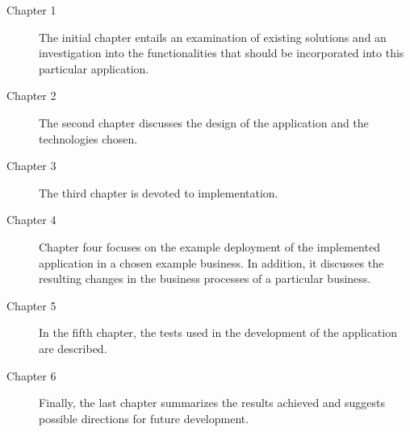 \begin{description}
\item[Chapter 1] The initial chapter entails an examination of existing solutions and an investigation into the functionalities that should be incorporated into this particular application.

\item[Chapter 2] The second chapter discusses the design of the application and the technologies chosen.

\item[Chapter 3] The third chapter is devoted to implementation.

\item[Chapter 4] Chapter four focuses on the example deployment of the implemented application in a chosen example business. In addition, it discusses the resulting changes in the business processes of a particular business.

\item[Chapter 5] In the fifth chapter, the tests used in the development of the application are described.

\item[Chapter 6] Finally, the last chapter summarizes the results achieved and suggests possible directions for future development.
\end{description}
